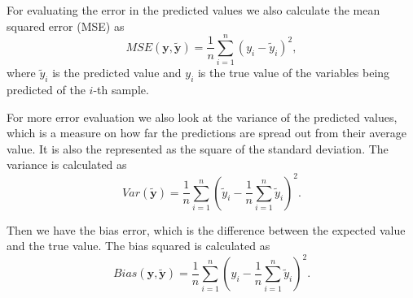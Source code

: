 \documentclass[12pt,a4paper,english]{article}
\begin{document}
For evaluating the error in the predicted values we also calculate the mean squared error (MSE) as
\begin{equation}
\label{eq:mse}
MSE(\textbf{y},\tilde{\textbf{y}})=\frac{1}{n}\sum_{i=1}^{n}(y_i-\tilde{y}_i)^2,
\end{equation}
where $\tilde{y}_i$ is the predicted value and $y_i$ is the true value of the variables being predicted of the $i$-th sample.

For more error evaluation we also look at the variance of the predicted values, which is a measure on how far the predictions are spread out from their average value. It is also the represented as the square of the standard deviation. The variance is calculated as
\begin{equation}
\label{eq:var}
Var(\tilde{\textbf{y}})=\frac{1}{n}\sum_{i=1}^{n}(\tilde{y}_i-\frac{1}{n}\sum_{i=1}^{n}\tilde{y}_i)^2.
\end{equation}

Then we have the bias error, which is the difference between the expected value and the true value. The bias squared is calculated as
\begin{equation}
\label{eq:bias}
Bias(\textbf{y},\tilde{\textbf{y}})=\frac{1}{n}\sum_{i=1}^{n}(y_i-\frac{1}{n}\sum_{i=1}^{n}\tilde{y}_i)^2.
\end{equation}
\end{document}
